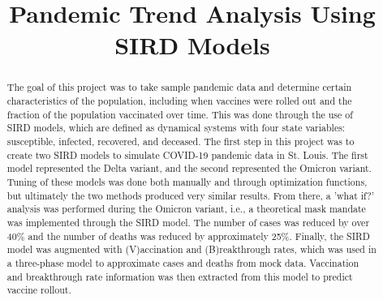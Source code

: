 \documentclass[conference]{IEEEtran}
\begin{document}
\title{Pandemic Trend Analysis Using SIRD Models}

\author{
\and
{}
\and
{}
}

\maketitle

\begin{abstract}
  The goal of this project was to take sample pandemic data and determine certain characteristics of the population, including when vaccines were rolled out and the fraction of the population vaccinated over time. This was done through the use of SIRD models, which are defined as dynamical systems with four state variables: susceptible, infected, recovered, and deceased. The first step in this project was to create two SIRD models to simulate COVID-19 pandemic data in St. Louis. The first model represented the Delta variant, and the second represented the Omicron variant. Tuning of these models was done both manually and through optimization functions, but ultimately the two methods produced very similar results. From there, a 'what if?' analysis was performed during the Omicron variant, i.e., a theoretical mask mandate was implemented through the SIRD model. The number of cases was reduced by over 40\% and the number of deaths was reduced by approximately 25\%. Finally, the SIRD model was augmented with (V)accination and (B)reakthrough rates, which was used in a three-phase model to approximate cases and deaths from mock data. Vaccination and breakthrough rate information was then extracted from this model to predict vaccine rollout.

\end{abstract}
\end{document}
